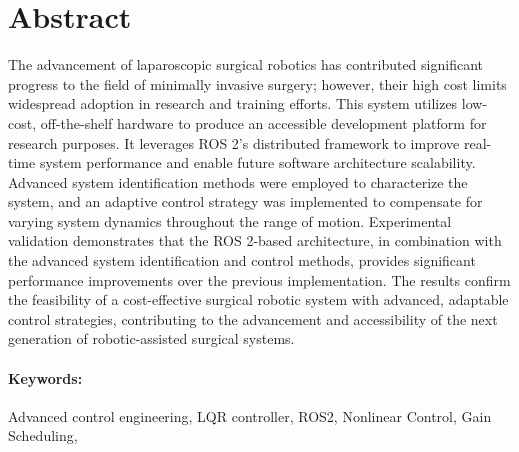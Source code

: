 

\section*{\centering Abstract}
The advancement of laparoscopic surgical robotics has contributed significant progress to the field of minimally invasive surgery; however, their high cost limits widespread adoption in research and training efforts. This system utilizes low-cost, off-the-shelf hardware to produce an accessible development platform for research purposes. It leverages ROS 2's distributed framework to improve real-time system performance and enable future software architecture scalability. Advanced system identification methods were employed to characterize the system, and an adaptive control strategy was implemented to compensate for varying system dynamics throughout the range of motion. Experimental validation demonstrates that the ROS 2-based architecture, in combination with the advanced system identification and control methods, provides significant performance improvements over the previous implementation. The results confirm the feasibility of a cost-effective surgical robotic system with advanced, adaptable control strategies, contributing to the advancement and accessibility of the next generation of robotic-assisted surgical systems.

\paragraph*{Keywords:} Advanced control engineering, LQR controller, ROS2, Nonlinear Control, Gain Scheduling, 

\newpage
